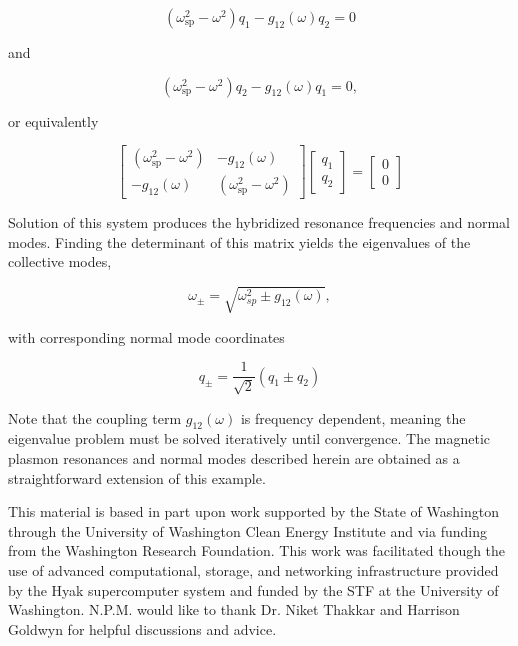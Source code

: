 \documentclass[journal=apchd5,manuscript=article]{achemso}
\begin{document}
\begin{equation}
(\omega_{\textrm{sp}}^2-\omega^2)q_1 -g_{12}(\omega)q_2 = 0
\label{fourier_eom_1}
\end{equation}

and

\begin{equation}
(\omega_{\textrm{sp}}^2-\omega^2)q_2 -g_{12}(\omega)q_1 = 0,
\label{fourier_eom_2}
\end{equation}

or equivalently

\begin{equation}
\begin{bmatrix}
(\omega_{\textrm{sp}}^2-\omega^2) & -g_{12}(\omega)\\
-g_{12}(\omega) & (\omega_{\textrm{sp}}^2-\omega^2)
\end{bmatrix}
\begin{bmatrix}
q_1\\
q_2
\end{bmatrix}
=
\begin{bmatrix}
0\\
0
\end{bmatrix}
\label{eom_matrix}
\end{equation}

Solution of this system produces the hybridized resonance frequencies and normal modes.
Finding the determinant of this matrix yields the eigenvalues of the collective modes,

\begin{equation}
\omega_{\pm} = \sqrt{\omega_{sp}^2 \pm g_{12}(\omega)},
\label{eigenvalues}
\end{equation}

\noindent with corresponding normal mode coordinates

\begin{equation}
q_{\pm} = \frac{1}{\sqrt{2}}\left(q_1 \pm q_2\right)
\label{eigenvectors}
\end{equation}

\noindent Note that the coupling term $g_{12}(\omega)$ is frequency dependent, meaning the eigenvalue problem must be solved iteratively until convergence. The magnetic plasmon resonances and normal modes described herein are obtained as a straightforward extension of this example.

\begin{acknowledgement}
This material is based in part upon work supported by the State of Washington through the University of Washington Clean Energy Institute and via funding from the Washington Research Foundation. This work was facilitated though the use of advanced computational, storage, and networking infrastructure provided by the Hyak supercomputer system and funded by the STF at the University of Washington. N.P.M. would like to thank Dr. Niket Thakkar and Harrison Goldwyn for helpful discussions and advice.
\end{acknowledgement}
\end{document}
